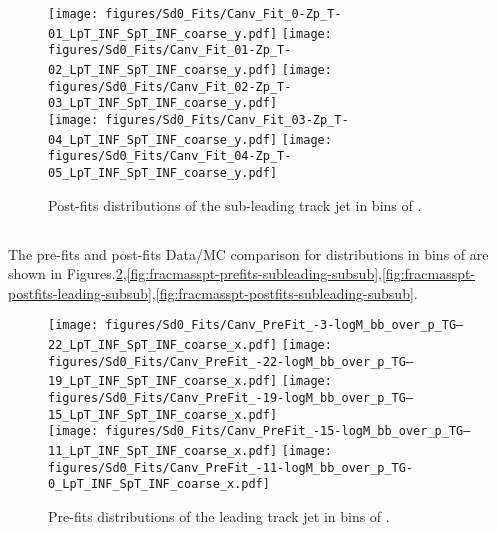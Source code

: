 \begin{figure}[htbp]
  \centering
 \texttt{[image: figures/Sd0\_Fits/Canv\_Fit\_0-Zp\_T-01\_LpT\_INF\_SpT\_INF\_coarse\_y.pdf]}
 \texttt{[image: figures/Sd0\_Fits/Canv\_Fit\_01-Zp\_T-02\_LpT\_INF\_SpT\_INF\_coarse\_y.pdf]}
 \texttt{[image: figures/Sd0\_Fits/Canv\_Fit\_02-Zp\_T-03\_LpT\_INF\_SpT\_INF\_coarse\_y.pdf]}\\
 \texttt{[image: figures/Sd0\_Fits/Canv\_Fit\_03-Zp\_T-04\_LpT\_INF\_SpT\_INF\_coarse\_y.pdf]}
 \texttt{[image: figures/Sd0\_Fits/Canv\_Fit\_04-Zp\_T-05\_LpT\_INF\_SpT\_INF\_coarse\_y.pdf]}

\caption{Post-fits \sdzero distributions of the sub-leading track jet in bins of \zpt. }
  \label{fig:ZpT-postfits-subleading-subsub}
\end{figure}



\clearpage
\subsection{\mpt}

The pre-fits and post-fits Data/MC comparison for \sdzero distributions in bins of \mpt are shown in Figures.\ref{fig:fracmasspt-prefits-leading-subsub},\ref{fig:fracmasspt-prefits-subleading-subsub},\ref{fig:fracmasspt-postfits-leading-subsub},\ref{fig:fracmasspt-postfits-subleading-subsub}.


\begin{figure}[htbp]
  \centering
 \texttt{[image: figures/Sd0\_Fits/Canv\_PreFit\_-3-logM\_bb\_over\_p\_TG--22\_LpT\_INF\_SpT\_INF\_coarse\_x.pdf]}
 \texttt{[image: figures/Sd0\_Fits/Canv\_PreFit\_-22-logM\_bb\_over\_p\_TG--19\_LpT\_INF\_SpT\_INF\_coarse\_x.pdf]}
 \texttt{[image: figures/Sd0\_Fits/Canv\_PreFit\_-19-logM\_bb\_over\_p\_TG--15\_LpT\_INF\_SpT\_INF\_coarse\_x.pdf]}\\
 \texttt{[image: figures/Sd0\_Fits/Canv\_PreFit\_-15-logM\_bb\_over\_p\_TG--11\_LpT\_INF\_SpT\_INF\_coarse\_x.pdf]}
 \texttt{[image: figures/Sd0\_Fits/Canv\_PreFit\_-11-logM\_bb\_over\_p\_TG-0\_LpT\_INF\_SpT\_INF\_coarse\_x.pdf]}

\caption{Pre-fits \sdzero distributions of the leading track jet in bins of \mpt. }
  \label{fig:fracmasspt-prefits-leading-subsub}
\end{figure}


